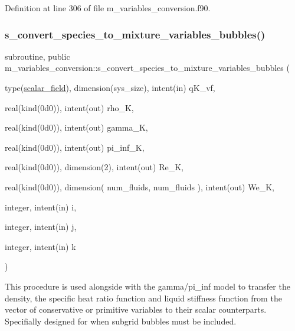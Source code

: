 Definition at line 306 of file m\+\_\+variables\+\_\+conversion.\+f90.

\mbox{\label{namespacem__variables__conversion_abe0d038aac3b3f0166c1a0c93c497e33}} 
\subsubsection{\texorpdfstring{s\+\_\+convert\+\_\+species\+\_\+to\+\_\+mixture\+\_\+variables\+\_\+bubbles()}{s\_convert\_species\_to\_mixture\_variables\_bubbles()}}
{\footnotesize\ttfamily subroutine, public m\+\_\+variables\+\_\+conversion\+::s\+\_\+convert\+\_\+species\+\_\+to\+\_\+mixture\+\_\+variables\+\_\+bubbles (\begin{DoxyParamCaption}\item[{type(\hyperlink{structm__derived__types_1_1scalar__field}{scalar\+\_\+field}), dimension(sys\+\_\+size), intent(in)}]{q\+K\+\_\+vf,  }\item[{real(kind(0d0)), intent(out)}]{rho\+\_\+K,  }\item[{real(kind(0d0)), intent(out)}]{gamma\+\_\+K,  }\item[{real(kind(0d0)), intent(out)}]{pi\+\_\+inf\+\_\+K,  }\item[{real(kind(0d0)), dimension(2), intent(out)}]{Re\+\_\+K,  }\item[{real(kind(0d0)), dimension( num\+\_\+fluids,                                         num\+\_\+fluids  ), intent(out)}]{We\+\_\+K,  }\item[{integer, intent(in)}]{i,  }\item[{integer, intent(in)}]{j,  }\item[{integer, intent(in)}]{k }\end{DoxyParamCaption})}



This procedure is used alongside with the gamma/pi\+\_\+inf model to transfer the density, the specific heat ratio function and liquid stiffness function from the vector of conservative or primitive variables to their scalar counterparts. Specifially designed for when subgrid bubbles must be included. 


